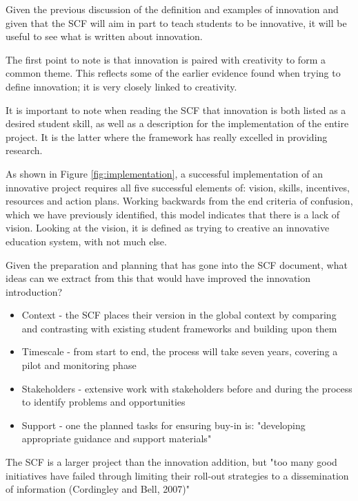 Given the previous discussion of the definition and examples of innovation and given that the SCF will aim in part to teach students to be innovative, it will be useful to see what is written about innovation.

The first point to note is that innovation is paired with creativity to form a common theme. This reflects some of the earlier evidence found when trying to define innovation; it is very closely linked to creativity.

It is important to note when reading the SCF that innovation is both listed as a desired student skill, as well as a description for the implementation of the entire project. It is the latter where the framework has really excelled in providing research.

As shown in Figure \ref{fig:implementation}, a successful implementation of an innovative project requires all five successful elements of: vision, skills, incentives, resources and action plans. Working backwards from the end criteria of confusion, which we have previously identified, this model indicates that there is a lack of vision. Looking at the vision, it is defined as trying to creative an innovative education system, with not much else.

Given the preparation and planning that has gone into the SCF document, what ideas can we extract from this that would have improved the innovation introduction?

\begin{itemize}
\item Context - the SCF places their version in the global context by comparing and contrasting with existing student frameworks and building upon them
\item Timescale - from start to end, the process will take seven years, covering a pilot and monitoring phase
\item Stakeholders - extensive work with stakeholders before and during the process to identify problems and opportunities
\item Support - one the planned tasks for ensuring buy-in is: "developing appropriate guidance and support materials"
\end{itemize}

The SCF is a larger project than the innovation addition, but "too many good initiatives have failed through limiting their roll-out strategies to a dissemination of information (Cordingley and Bell, 2007)" \cite{ADEC2016}
